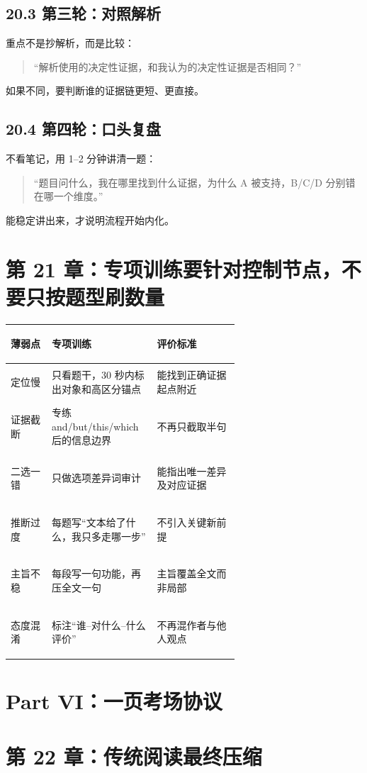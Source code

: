 \documentclass[11pt,a4paper]{ctexart}
\begin{document}
\subsection{20.3 第三轮：对照解析}
重点不是抄解析，而是比较：
\begin{quote}
“解析使用的决定性证据，和我认为的决定性证据是否相同？”
\end{quote}
如果不同，要判断谁的证据链更短、更直接。

\subsection{20.4 第四轮：口头复盘}
不看笔记，用 1--2 分钟讲清一题：
\begin{quote}
“题目问什么，我在哪里找到什么证据，为什么 A 被支持，B/C/D 分别错在哪一个维度。”
\end{quote}
能稳定讲出来，才说明流程开始内化。

\section{第 21 章：专项训练要针对控制节点，不要只按题型刷数量}
\begin{center}
\small
\begin{tabularx}{\linewidth}{>{\bfseries\raggedright\arraybackslash}p{0.18\linewidth} >{\raggedright\arraybackslash}p{0.46\linewidth} Y}
\toprule
薄弱点 & 专项训练 & 评价标准 \\
\midrule
定位慢 & 只看题干，30 秒内标出对象和高区分锚点 & 能找到正确证据起点附近 \\
证据截断 & 专练 and/but/this/which 后的信息边界 & 不再只截取半句 \\
二选一错 & 只做选项差异词审计 & 能指出唯一差异及对应证据 \\
推断过度 & 每题写“文本给了什么，我只多走哪一步” & 不引入关键新前提 \\
主旨不稳 & 每段写一句功能，再压全文一句 & 主旨覆盖全文而非局部 \\
态度混淆 & 标注“谁--对什么--什么评价” & 不再混作者与他人观点 \\
\bottomrule
\end{tabularx}
\end{center}

\newpage
\section{Part VI：一页考场协议}

\section{第 22 章：传统阅读最终压缩}
\end{document}
